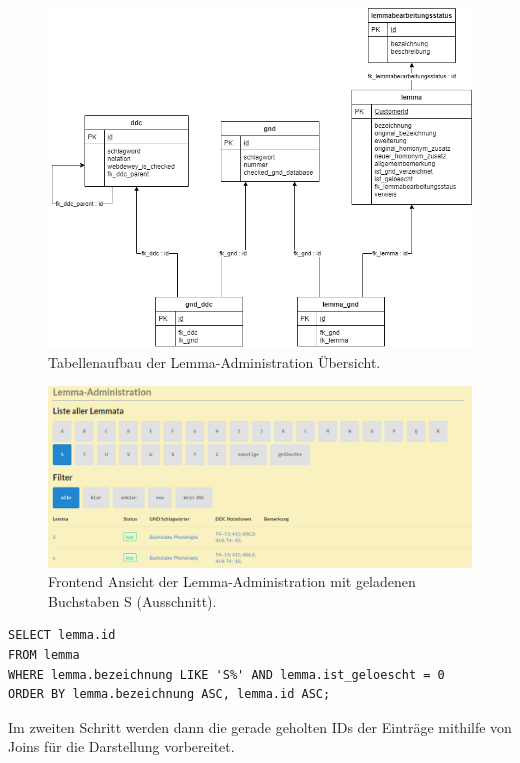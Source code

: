 \begin{figure}
	\centering
	\includegraphics[width=0.8\linewidth]{images/structure_lemmaadministration.png}
	\caption{Tabellenaufbau der Lemma-Administration Übersicht.}
	\label{img:lAdminStructure}
\end{figure}

\begin{figure}
	\centering
	\includegraphics[width=1\linewidth]{images/lemmaadministration_sample.PNG}
	\caption{Frontend Ansicht der Lemma-Administration mit geladenen Buchstaben S (Ausschnitt).}
	\label{img:lAdminSample}
\end{figure}

\lstset{language=SQL}
\begin{lstlisting}[frame=single, caption=Abfrage aller Lemmata mit den Buchstaben S (Part 1),captionpos=b] 
SELECT lemma.id
FROM lemma
WHERE lemma.bezeichnung LIKE 'S%' AND lemma.ist_geloescht = 0
ORDER BY lemma.bezeichnung ASC, lemma.id ASC;
\end{lstlisting}

Im zweiten Schritt werden dann die gerade geholten IDs der Einträge mithilfe von Joins für die Darstellung vorbereitet.

